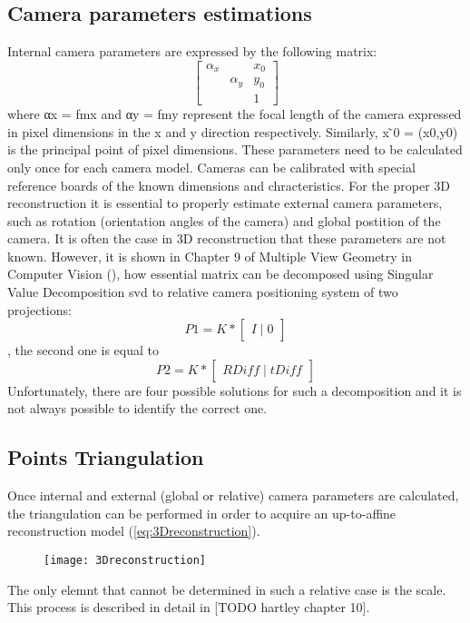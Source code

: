 \subsection{Camera parameters estimations}
Internal camera parameters are expressed by the following matrix:
\begin{equation}
\begin{bmatrix}
\alpha _{x} &  & x_{0} \\ 
 & \alpha _{y} & y_{0}\\ 
 &  & 1
\end{bmatrix}
\end{equation}
where αx = fmx and αy = fmy represent the focal length of the camera expressed in pixel dimensions in the x and y direction respectively. 
Similarly, x ̃0 = (x0,y0) is the principal point of pixel dimensions. These parameters need to be calculated only once for each camera model. Cameras can be calibrated with special reference boards of the known dimensions and chracteristics.
For the proper 3D reconstruction it is essential to properly estimate external camera parameters, such as rotation (orientation angles of the camera) and global postition of the camera. It is often the case in 3D reconstruction that these parameters are not known. However, it is shown in Chapter 9 of Multiple View Geometry in Computer Vision (\cite{HartleyMultipleView}), how essential matrix can be decomposed using Singular Value Decomposition \gls{svd} to relative camera positioning system of two projections:
\begin{equation}
 P1 = K * \begin{bmatrix}I\mid 0\end{bmatrix}
\end{equation},
the second one is equal to 
\begin{equation}
 P2 = K * \begin{bmatrix}RDiff\mid tDiff\end{bmatrix}
\end{equation}
Unfortunately, there are four possible solutions for such a decomposition and it is not always possible to identify the correct one.
\subsection{Points Triangulation}
Once internal and external (global or relative) camera parameters are calculated, the triangulation can be performed in order to acquire an up-to-affine reconstruction model (\ref{eq:3Dreconstruction}).
\begin{figure}[p]
    \centering
    \texttt{[image: 3Dreconstruction]}
    \caption{}
    \label{fig:3Dreconstruction}
\end{figure}
The only elemnt that cannot be determined in such a relative case is the scale. This process is described in detail in [TODO hartley chapter 10].
